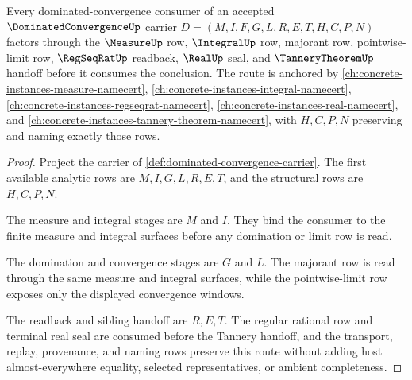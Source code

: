 \begin{theorem}
\label{thm:dominated-convergence-measure-integral-route}
Every dominated-convergence consumer of an accepted $\DominatedConvergenceUp$ carrier $D=(M,I,F,G,L,R,E,T,H,C,P,N)$ factors through the $\MeasureUp$ row, $\IntegralUp$ row, majorant row, pointwise-limit row, $\RegSeqRatUp$ readback, $\RealUp$ seal, and $\TanneryTheoremUp$ handoff before it consumes the conclusion. The route is anchored by \autoref{ch:concrete-instances-measure-namecert}, \autoref{ch:concrete-instances-integral-namecert}, \autoref{ch:concrete-instances-regseqrat-namecert}, \autoref{ch:concrete-instances-real-namecert}, and \autoref{ch:concrete-instances-tannery-theorem-namecert}, with $H,C,P,N$ preserving and naming exactly those rows.
\end{theorem}
\begin{proof}
Project the carrier of \autoref{def:dominated-convergence-carrier}. The first available analytic rows are $M,I,G,L,R,E,T$, and the structural rows are $H,C,P,N$.

The measure and integral stages are $M$ and $I$. They bind the consumer to the finite measure and integral surfaces before any domination or limit row is read.

The domination and convergence stages are $G$ and $L$. The majorant row is read through the same measure and integral surfaces, while the pointwise-limit row exposes only the displayed convergence windows.

The readback and sibling handoff are $R,E,T$. The regular rational row and terminal real seal are consumed before the Tannery handoff, and the transport, replay, provenance, and naming rows preserve this route without adding host almost-everywhere equality, selected representatives, or ambient completeness.
\end{proof}

